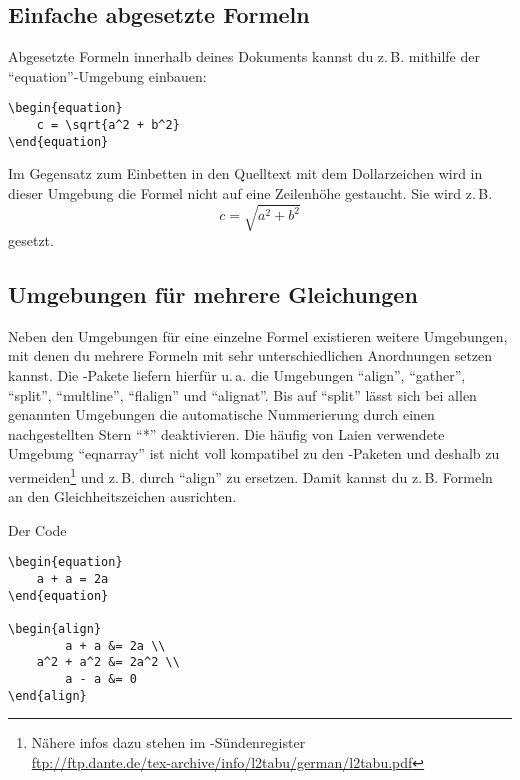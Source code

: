 \subsection{Einfache abgesetzte Formeln}

Abgesetzte Formeln innerhalb deines Dokuments kannst du z.\,B. mithilfe der \enquote{equation}-Umgebung einbauen:
\begin{lstlisting}
\begin{equation}
	c = \sqrt{a^2 + b^2}
\end{equation}
\end{lstlisting}

Im Gegensatz zum Einbetten in den Quelltext mit dem Dollarzeichen wird in dieser Umgebung die Formel nicht auf eine Zeilenhöhe gestaucht. Sie wird z.\,B.
\begin{equation}
	c = \sqrt{a^2 + b^2}
\end{equation}
gesetzt.

\subsection{Umgebungen für mehrere Gleichungen}

Neben den Umgebungen für eine einzelne Formel existieren weitere Umgebungen, mit denen du mehrere Formeln mit sehr unterschiedlichen Anordnungen setzen kannst. Die \AmSmath-Pakete liefern hierfür u.\,a. die Umgebungen \enquote{align}, \enquote{gather}, \enquote{split}, \enquote{multline}, \enquote{flalign} und \enquote{alignat}. Bis auf \enquote{split} lässt sich bei allen genannten Umgebungen die automatische Nummerierung durch einen nachgestellten Stern \enquote{*} deaktivieren. Die häufig von Laien verwendete Umgebung \enquote{eqnarray} ist nicht voll kompatibel zu den \AmSmath-Paketen und deshalb zu vermeiden\footnote{Nähere infos dazu stehen im \DMLLaTeX-Sündenregister\\\href{ftp://ftp.dante.de/tex-archive/info/l2tabu/german/l2tabu.pdf}{ftp://ftp.dante.de/tex-archive/info/l2tabu/german/l2tabu.pdf}} und z.\,B. durch \enquote{align} zu ersetzen. Damit kannst du z.\,B. Formeln an den Gleichheitszeichen ausrichten.

Der Code
\begin{lstlisting}
\begin{equation}
	a + a = 2a
\end{equation}

\begin{align}
	    a + a &= 2a \\
	a^2 + a^2 &= 2a^2 \\
	    a - a &= 0
\end{align}
\end{lstlisting} 


